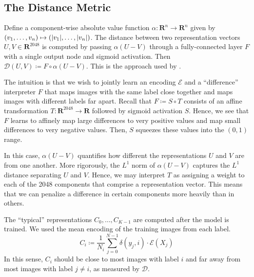 \documentclass[12pt]{article}
\DeclarePairedDelimiter{\abs}{\lvert}{\rvert}
\begin{document}
\subsection{The Distance Metric} \label{subsec:the_distance_metric}

Define a component-wise absolute value function \(\alpha \colon \mathbf{R}^n \to \mathbf{R}^n\) given by \((v_1, \dotsc, v_n) \mapsto (\abs{v_1}, \dotsc, \abs{v_n})\). The distance between two representation vectors \(U, V \in \mathbf{R}^{2048}\) is computed by passing \(\alpha(U - V)\) through a fully-connected layer \(F\) with a single output node and sigmoid activation. Then \(\mathcal{D}(U, V) \coloneqq F \circ \alpha(U - V)\). This is the approach used by \citet{cmu}.

The intuition is that we wish to jointly learn an encoding \(\mathcal{E}\) and a ``difference'' interpreter \(F\) that maps images with the same label close together and maps images with different labels far apart. Recall that \(F \coloneqq S \circ T\) consists of an affine transformation \(T \colon \mathbf{R}^{2048} \to \mathbf{R}\) followed by sigmoid activation \(S\). Hence, we see that \(F\) learns to affinely map large differences to very positive values and map small differences to very negative values. Then, \(S\) squeezes these values into the \((0, 1)\) range.

In this case, \(\alpha(U - V)\) quantifies how different the representations \(U\) and \(V\) are from one another. More rigorously, the \(L^1\) norm of \(\alpha(U - V)\) captures the \(L^1\) distance separating \(U\) and \(V\). Hence, we may interpret \(T\) as assigning a weight to each of the 2048 components that comprise a representation vector. This means that we can penalize a difference in certain components more heavily than in others.

The ``typical'' representations \(C_0, \dotsc, C_{K - 1}\) are computed after the model is trained. We used the mean encoding of the training images from each label.
\begin{equation}
    C_i \coloneqq \frac{1}{N_i} \sum_{j = 0}^{N - 1} \delta(y_j, i) \cdot \mathcal{E}(X_j) \label{eq:typical_rep}
\end{equation}
In this sense, \(C_i\) should be close to most images with label \(i\) and far away from most images with label \(j \neq i\), as measured by \(\mathcal{D}\).



\end{document}
